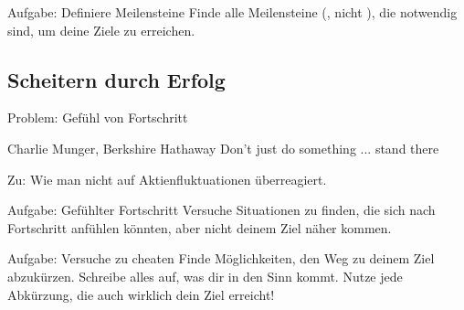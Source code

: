 \begin{frame}[c]
    \begin{block}{Aufgabe: Definiere Meilensteine}
        Finde alle Meilensteine (, nicht ), die
        notwendig sind, um deine Ziele zu erreichen.
    \end{block}
\end{frame}


%
%
%


\subsection{Scheitern durch Erfolg}

\begin{frame}[c]{Problem: Gefühl von Fortschritt}
    \large
    \begin{aquote}{Charlie Munger, Berkshire Hathaway}
        Don’t just do something ... stand there
    \end{aquote}
    \normalsize
    Zu: Wie man nicht auf Aktienfluktuationen überreagiert.
\end{frame}


\begin{frame}[c]
    \vspace{1cm}
    \begin{block}{Aufgabe: Gefühlter Fortschritt}
        Versuche Situationen zu finden, die sich nach Fortschritt anfühlen
        könnten, aber nicht deinem Ziel näher kommen.
    \end{block}
    \vspace{0.5cm}
    \begin{block}{Aufgabe: Versuche zu cheaten}
        Finde Möglichkeiten, den Weg zu deinem Ziel abzukürzen. Schreibe
        alles auf, was dir in den Sinn kommt. Nutze jede Abkürzung, die auch
        wirklich dein Ziel erreicht!
    \end{block}
\end{frame}



